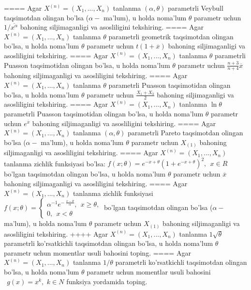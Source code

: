 ====
Agar \(X^{(n)} = \left( X_{1},...,X_{n} \right)\) tanlanma \((\alpha,\theta)\) parametrli Veybull taqsimotdan olingan bo'lsa (\(\alpha -\) ma'lum), u holda noma'lum \(\theta\) parametr uchun \(1/\overline{x^{\alpha}}\) bahoning siljimaganligi va asosliligini tekshiring.
====
Agar \(X^{(n)} = \left( X_{1},...,X_{n} \right)\) tanlanma \(\theta\) parametrli geometrik taqsimotdan olingan bo'lsa, u holda noma'lum \(\theta\) parametr uchun \(t(1 + \overline{x})\) bahoning siljimaganligi va asosliligini tekshiring.
====
Agar \(X^{(n)} = \left( X_{1},...,X_{n} \right)\) tanlanma \(\theta\) parametrli Puasson taqsimotidan olingan bo'lsa, u holda noma'lum \(\theta\) parametr uchun \(\frac{n + 3}{n + 4}\overline{x}\) bahoning siljimaganligi va asosliligini tekshiring.
====
Agar \(X^{(n)} = \left( X_{1},...,X_{n} \right)\) tanlanma \(\theta\) parametrli Puasson taqsimotidan olingan bo'lsa, u holda noma'lum \(\theta\) parametr uchun \(\frac{X_{1} + X_{3}}{2}\) bahoning siljimaganligi va asosliligini tekshiring.
====
Agar \(X^{(n)} = \left( X_{1},...,X_{n} \right)\) tanlanma \(\ln\theta\) parametrli Puasson taqsimotidan olingan bo'lsa, u holda noma'lum \(\theta\) parametr uchun \(e^{\overline{x}}\) bahoning siljimaganligi va asosliligini tekshiring.
====
Agar \(X^{(n)} = \left( X_{1},...,X_{n} \right)\) tanlanma \((\alpha,\theta)\) parametrli Pareto taqsimotdan olingan bo'lsa (\(\alpha -\) ma'lum), u holda noma'lum \(\theta\) parametr uchun \(X_{(1)}\) bahoning siljimaganligi va asosliligini tekshiring.
====
Agar \(X^{(n)} = \left( X_{1},...,X_{n} \right)\) tanlanma zichlik funksiyasi bo'lsa: \(f(x;\theta) = e^{- x + \theta}\left( 1 + e^{- x + \theta} \right)^{2},\ \ x \in R\)bo'lgan taqsimotdan olingan bo'lsa, u holda noma'lum \(\theta\) parametr uchun \(\overline{x}\) bahoning siljimaganligi va asosliligini tekshiring.
====
Agar \(X^{(n)} = \left( X_{1},...,X_{n} \right)\) tanlanma zichlik funksiyasi \(f(x;\theta) = \left\{ \begin{matrix}
\alpha^{- 1}e^{- \ \frac{x - \theta}{\alpha}},\ \ x \geq \theta, \\
0,\ \ x < \theta
\end{matrix} \right.\ \)bo'lgan taqsimotdan olingan bo'lsa (\(\alpha -\) ma'lum), u holda noma'lum \(\theta\) parametr uchun \(X_{(1)}\) bahoning siljimaganligi va asosliligini tekshiring.
++++
Agar \(X^{(n)} = \left( X_{1},...,X_{n} \right)\) tanlanma \(1\sqrt{\theta}\) parametrli ko'rsatkichli taqsimotdan olingan bo'lsa, u holda noma'lum \(\theta\) parametr uchun momentlar usuli bahosini toping.
====
Agar \(X^{(n)} = \left( X_{1},...,X_{n} \right)\) tanlanma \(1/\theta\) parametrli ko'rsatkichli taqsimotdan olingan bo'lsa, u holda noma'lum \(\theta\) parametr uchun momentlar usuli bahosini \(\ \ g(x) = x^{k},\) \(k \in N\) funksiya yordamida toping.
